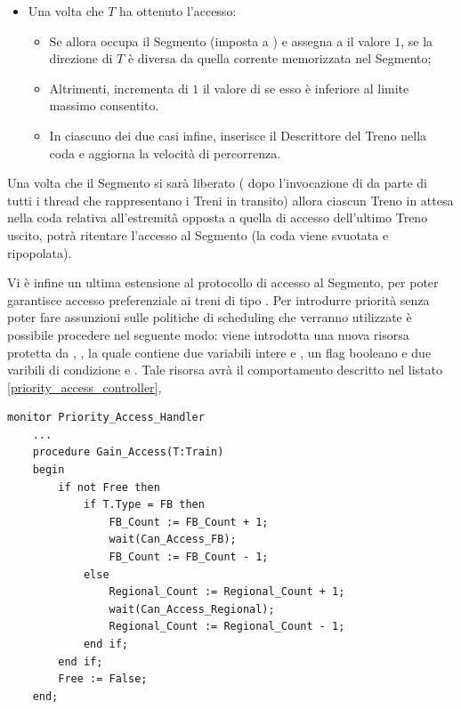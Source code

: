 \begin{description}
\begin{itemize}
\begin{lstlisting}[caption=\small{Procedura protetta \ttt{Enter\_Monitor} per l'accesso al Segmento.},label=code:segment_monitor_enter]
				((not Free) and
				 (Access_End = Current_Direction) and 
				 (Access_Number = MAX) and 
				 (First_End_Count > 0)) loop
				wait(Can_Enter_Second_End);
			end loop;
		end if;
		// A questo punto il Treno puo' accedere.
		...
	end;
...	
end monitor;
\end{lstlisting}
			\item Una volta che $T$ ha ottenuto l'accesso:
				\begin{itemize}
					\item Se  allora occupa il Segmento (imposta  a ) e assegna a  il valore $1$, se la direzione di $T$ è diversa da quella corrente memorizzata nel Segmento;
					\item Altrimenti, incrementa di $1$ il valore di  se esso è inferiore al limite massimo consentito.
					\item In ciascuno dei due casi infine, inserisce il Descrittore del Treno nella coda  e aggiorna la velocità di percorrenza.
				\end{itemize}
		\end{itemize}
			
			Una volta che il Segmento si sarà liberato ( dopo l'invocazione di  da parte di tutti i thread che rappresentano i Treni in transito) allora ciascun Treno in attesa nella coda relativa all'estremità opposta a quella di accesso dell'ultimo Treno uscito, potrà ritentare l'accesso al Segmento (la coda viene svuotata e ripopolata).
			
			Vi è infine un ultima estensione al protocollo di accesso al Segmento, per poter garantisce accesso preferenziale ai treni di tipo . Per introdurre priorità senza poter fare assunzioni sulle politiche di scheduling che verranno utilizzate è possibile procedere nel seguente modo: viene introdotta una nuova risorsa protetta da , , la quale contiene due variabili intere  e , un flag booleano  e due varibili di condizione  e . Tale risorsa avrà il comportamento descritto nel listato \ref{priority_access_controller},
	
\begin{lstlisting}[caption=\small{monitor utilizzato per garantire accesso preferenziale a Treni di tipo \ttt{FB}.}, label=priority_access_controller]
monitor Priority_Access_Handler 
	...
	procedure Gain_Access(T:Train) 
	begin
		if not Free then
			if T.Type = FB then
				FB_Count := FB_Count + 1;
				wait(Can_Access_FB);
				FB_Count := FB_Count - 1;
			else
				Regional_Count := Regional_Count + 1;
				wait(Can_Access_Regional);
				Regional_Count := Regional_Count - 1;
			end if;
		end if;
		Free := False;
	end;
	

\end{lstlisting}
\end{description}
